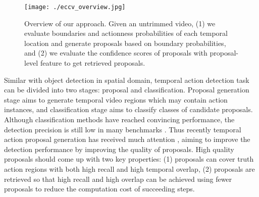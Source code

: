 \documentclass[runningheads]{llncs}
\begin{document}
\begin{figure}[t]
\setlength{\abovecaptionskip}{-0.3cm} %
\setlength{\belowcaptionskip}{-0.5cm} %
\begin{center}
\begin{minipage}[b]{1.0\linewidth}
  \centering
  \centerline{\texttt{[image: ./eccv\_overview.jpg]}}
  \medskip
\end{minipage}
\end{center}
   \caption{Overview of our approach. Given an untrimmed video, (1) we evaluate boundaries and actionness probabilities of each temporal location and generate proposals based on boundary probabilities, and (2) we evaluate the confidence scores of proposals with proposal-level feature to get retrieved proposals.}
\label{fig_overview}
\end{figure}


Similar with object detection in spatial domain, temporal action detection task can be divided into two stages: proposal and classification. Proposal generation stage aims to generate temporal video regions which may contain action instances, and classification stage aims to classify classes of candidate proposals. 
Although  classification methods  have reached convincing performance,  the detection precision is still low in many benchmarks \cite{caba2015activitynet,jiang2014thumos}. 
%
Thus recently temporal action proposal generation has received much attention  \cite{sst_buch_cvpr17,fast_temporal_activity_cvpr16,escorcia2016daps,gao2017turn}, aiming to improve the detection performance by improving the quality of proposals.
High quality proposals should come up with two key properties: (1) proposals can cover truth action regions with both high recall and high temporal overlap, (2) proposals are retrieved so that high recall and high overlap can be achieved using fewer proposals to reduce the computation cost of succeeding steps.

\end{document}
